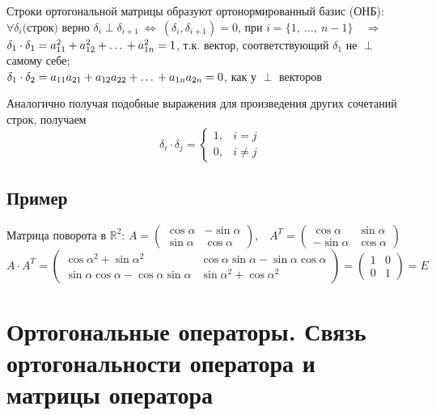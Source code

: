 \documentclass[12pt]{article}
\begin{document}
Строки ортогональной матрицы образуют ортонормированный базис (ОНБ):\\
\hspace*{36pt} $\forall \delta_i\textrm{(строк)}$ верно $\delta_i \perp \delta_{i+1} \ \Leftrightarrow \ (\delta_i, \delta_{i+1}) = 0$, при $i = \{1,\ \dots,\ n-1\} \quad \Rightarrow$ \\
\hspace*{36pt} $\delta_1 \cdot \delta_1 = a_{11}^2 + a_{12}^2 +\textrm{\dots}+ a_{1n}^2 = 1$,
т.к. вектор, соответствующий $\delta_1$ не $\perp$ самому себе;\\
\hspace*{36pt} $\delta_1 \cdot \delta_2 = a_{11}a_{21} + a_{12}a_{22} +\textrm{\dots}+ a_{1n}a_{2n} = 0$, как у $\perp$ векторов

Аналогично получая подобные выражения для произведения других сочетаний строк, получаем
\[
    \delta_i \cdot \delta_j =
    \begin{cases}
        1, & i = j    \\
        0, & i \neq j
    \end{cases}
\]

\subsection*{Пример}
Матрица поворота в $\mathbb{R}^2$:
$ A =
    \begin{pmatrix}
        \cos{\alpha} & -\sin{\alpha} \\
        \sin{\alpha} & \cos{\alpha}
    \end{pmatrix}
    \textrm{,}\quad A^T =
    \begin{pmatrix}
        \cos{\alpha}  & \sin{\alpha} \\
        -\sin{\alpha} & \cos{\alpha}
    \end{pmatrix}$\\
\[
    A \cdot A^T =
    \begin{pmatrix}
        \cos{\alpha}^2 + \sin{\alpha}^2                     &
        \cos{\alpha}\sin{\alpha} - \sin{\alpha}\cos{\alpha}   \\
        \sin{\alpha}\cos{\alpha} - \cos{\alpha}\sin{\alpha} &
        \sin{\alpha}^2 + \cos{\alpha}^2
    \end{pmatrix}
    =
    \begin{pmatrix}
        1 & 0 \\
        0 & 1
    \end{pmatrix}
    = E
\]
\section{Ортогональные операторы. Связь ортогональности оператора и матрицы оператора}
\end{document}
